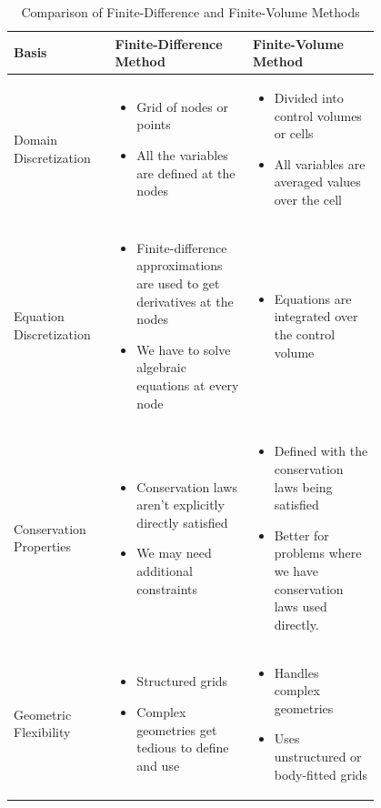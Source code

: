 \documentclass[12pt]{article}
\begin{document}
\begin{table}
\centering

\begin{tabular}{|p{0.2\linewidth}|p{0.3\linewidth}|p{0.3\linewidth}|}
\hline
\textbf{ Basis} & \textbf{Finite-Difference Method} & \textbf{Finite-Volume Method} \\
\hline
Domain Discretization &
\begin{itemize}
  \item Grid of nodes or points
  \item All the variables are defined at the nodes
\end{itemize} &
\begin{itemize}
  \item Divided into control volumes or cells
  \item All variables are averaged values over the cell
\end{itemize} \\
\hline
Equation Discretization &
\begin{itemize}
  \item Finite-difference approximations are used to get derivatives at the nodes
  \item We have to solve algebraic equations at every node
\end{itemize} &
\begin{itemize}
  \item Equations are integrated over the control volume
\end{itemize} \\
\hline
Conservation Properties &
\begin{itemize}
  \item Conservation laws aren't explicitly directly satisfied
  \item We may need additional constraints 
\end{itemize} &
\begin{itemize}
  \item Defined with the conservation laws being satisfied
  \item Better for problems where we have conservation laws used directly.
\end{itemize} \\
\hline
Geometric Flexibility &
\begin{itemize}
  \item Structured grids 
  \item Complex geometries get tedious to define and use
\end{itemize} &
\begin{itemize}
  \item Handles complex geometries 
  \item Uses unstructured or body-fitted grids
\end{itemize} \\
\hline
\end{tabular}
\caption{Comparison of Finite-Difference and Finite-Volume Methods}
\label{tab:comparison}
\end{table}
\end{document}
